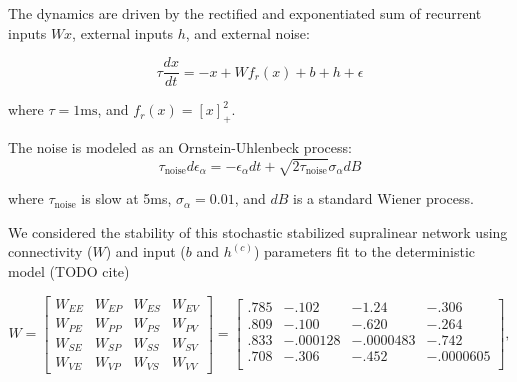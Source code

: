 \documentclass[11pt]{article}
\begin{document}
The dynamics are driven by the rectified and exponentiated sum of recurrent inputs $Wx$, external inputs $h$, and external noise:

\begin{equation}
\tau \frac{dx}{dt} = -x +Wf_r(x) + b + h + \epsilon
\end{equation}

where $\tau = 1 \text{ms}$, and $f_r(x) = \left[x \right]_+^2$.

The noise is modeled as an Ornstein-Uhlenbeck process:
\begin{equation}
\tau_{\text{noise}} d\epsilon_\alpha = -\epsilon_\alpha dt + \sqrt{2\tau_{\text{noise}}}\sigma_\alpha dB
\end{equation}

where $\tau_{\text{noise}}$ is slow at 5ms, $\sigma_\alpha =  0.01 $, and $dB$ is a standard Wiener process.

We considered the stability of this stochastic stabilized supralinear network using connectivity ($W$) and input ($b$ and $h^{(c)}$) parameters fit to the deterministic model (TODO cite)

\begin{equation}
W =  \begin{bmatrix} W_{EE} & W_{EP} & W_{ES} & W_{EV} \\
W_{PE} & W_{PP} & W_{PS} & W_{PV} \\
W_{SE} & W_{SP} & W_{SS} & W_{SV} \\
W_{VE} & W_{VP} & W_{VS} & W_{VV}  \end{bmatrix} = 
 \begin{bmatrix} .785 & -.102 & -1.24 & -.306 \\
.809 & -.100 & -.620 & -.264 \\
.833 & -.000128 & -.0000483 & -.742 \\
.708 & -.306 & -.452 & -.0000605 \\
 \end{bmatrix},
\end{equation} 
\end{document}
